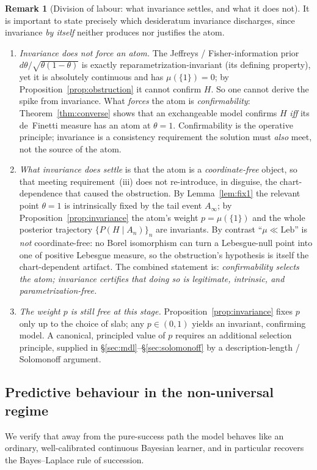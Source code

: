 \documentclass{amsart}
\theoremstyle{definition}
\newtheorem{remark}{Remark}
\begin{document}
\begin{remark}[Division of labour: what invariance settles, and what it does
not]\label{rem:invariance}
It is important to state precisely which desideratum invariance discharges, since
invariance \emph{by itself} neither produces nor justifies the atom.
\begin{enumerate}
\item[(I)] \emph{Invariance does not force an atom.} The Jeffreys / Fisher\nobreakdash-information
prior $d\theta/\sqrt{\theta(1-\theta)}$ is exactly reparametrization-invariant
(its defining property), yet it is absolutely continuous and has $\mu(\{1\})=0$;
by Proposition~\ref{prop:obstruction} it cannot confirm $H$. So one cannot derive
the spike from invariance. What \emph{forces} the atom is \emph{confirmability}:
Theorem~\ref{thm:converse} shows that an exchangeable model confirms $H$
\emph{iff} its de~Finetti measure has an atom at $\theta=1$. Confirmability is the
operative principle; invariance is a consistency requirement the solution must
\emph{also} meet, not the source of the atom.
\item[(II)] \emph{What invariance does settle} is that the atom is a
\emph{coordinate-free} object, so that meeting requirement~(iii) does not
re-introduce, in disguise, the chart-dependence that caused the obstruction. By
Lemma~\ref{lem:fix1} the relevant point $\theta=1$ is intrinsically fixed by the
tail event $A_\infty$; by Proposition~\ref{prop:invariance} the atom's weight
$p=\mu(\{1\})$ and the whole posterior trajectory $\{P(H\mid A_n)\}_n$ are
invariants. By contrast ``$\mu\ll\mathrm{Leb}$'' is \emph{not} coordinate-free:
no Borel isomorphism can turn a Lebesgue-null point into one of positive Lebesgue
measure, so the obstruction's hypothesis is itself the chart-dependent artifact.
The combined statement is: \emph{confirmability selects the atom; invariance
certifies that doing so is legitimate, intrinsic, and parametrization-free.}
\item[(III)] \emph{The weight $p$ is still free at this stage.}
Proposition~\ref{prop:invariance} fixes $p$ only up to the choice of slab; any
$p\in(0,1)$ yields an invariant, confirming model. A canonical, principled value
of $p$ requires an additional selection principle, supplied in
\S\ref{sec:mdl}--\S\ref{sec:solomonoff} by a description-length / Solomonoff
argument.
\end{enumerate}
\end{remark}


\subsection{Predictive behaviour in the non-universal regime}
We verify that away from the pure-success path the model behaves like an
ordinary, well-calibrated continuous Bayesian learner, and in particular
recovers the Bayes--Laplace rule of succession.
\end{document}
